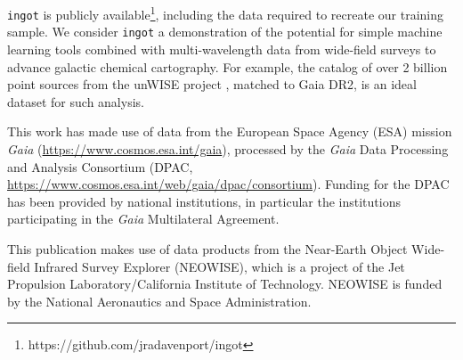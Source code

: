 \documentclass[modern]{rnaastex}
\newcommand{\ingot}{{\tt ingot}\xspace} %
\begin{document}
\ingot is publicly available\footnote{https://github.com/jradavenport/ingot}, including the data required to recreate our training sample. We consider \ingot a demonstration of the  potential for simple machine learning tools combined with multi-wavelength data from wide-field surveys to advance galactic chemical cartography. For example, the catalog of over 2 billion point sources from the unWISE project \citep{schlafly2019}, matched to Gaia DR2, is an ideal dataset for such analysis.




\acknowledgments


This work has made use of data from the European Space Agency (ESA) mission
{\it Gaia} (\url{https://www.cosmos.esa.int/gaia}), processed by the {\it Gaia}
Data Processing and Analysis Consortium (DPAC,
\url{https://www.cosmos.esa.int/web/gaia/dpac/consortium}). Funding for the DPAC
has been provided by national institutions, in particular the institutions
participating in the {\it Gaia} Multilateral Agreement.

This publication makes use of data products from the Near-Earth Object Wide-field Infrared Survey Explorer (NEOWISE), which is a project of the Jet Propulsion Laboratory/California Institute of Technology. NEOWISE is funded by the National Aeronautics and Space Administration.




\end{document}
